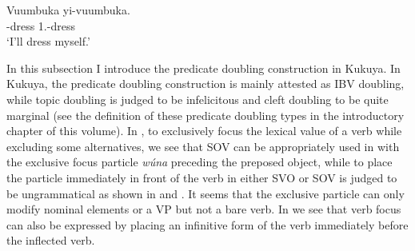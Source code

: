\documentclass[output=paper,colorlinks,citecolor=brown,
]{langscibook}
\begin{document}
\begin{exe}
\ex
\label{55}
\gll
Vuumbuka yi-vuumbuka.\\
\Inf{}-dress 1\Sg{}.\Sm{}-dress \\
\trans ‘I'll dress myself.’     

\end{exe}
In this subsection I introduce the predicate doubling construction in Kukuya. In Kukuya, the predicate doubling construction is mainly attested as IBV doubling, while topic doubling is judged to be infelicitous and cleft doubling to be quite marginal (see the definition of these predicate doubling types in the introductory chapter of this volume). In , to exclusively focus the lexical value of a verb while excluding some alternatives, we see that SOV can be appropriately used in  with the exclusive focus particle \textit{wúna} preceding the preposed object, while to place the particle immediately in front of the verb in either SVO or SOV is judged to be ungrammatical as shown in  and . It seems that the exclusive particle can only modify nominal elements or a VP but not a bare verb. In  we see that verb focus can also be expressed by placing an infinitive form of the verb immediately before the inflected verb.
\end{document}
